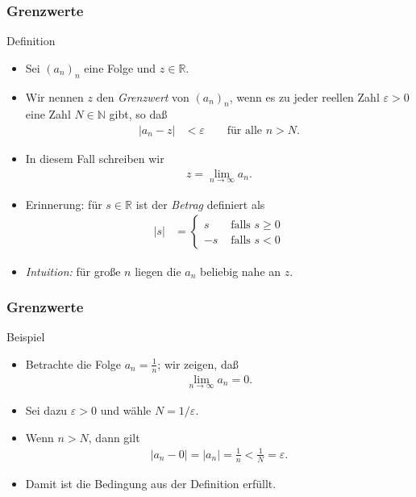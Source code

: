 \documentclass{beamer}
\renewcommand{\emph}[1]{{\textcolor{solarizedRed}{\itshape #1}}}
\newcommand\NN{\mathbb N}
\newcommand\RR{\mathbb R}
\newcommand{\eps}{\varepsilon}
\renewcommand{\ae}{\"a}
\newcommand{\ue}{\"u}
\newcommand{\mytitle}{Grenzwerte}
\begin{document}
\begin{frame}\frametitle{\mytitle}
	\begin{block}{Definition}
		\begin{itemize}
			\item Sei $(a_n)_n$ eine Folge und $z\in\RR$.
			\item Wir nennen $z$ den \emph{Grenzwert} von $(a_n)_n$, wenn es zu jeder reellen Zahl $\eps>0$ eine Zahl $N\in\NN$ gibt, so da\ss\ 
				\begin{align*}
					|a_n-z|&<\eps\qquad\mbox{f\ue r alle }n>N.
				\end{align*}
			\item In diesem Fall schreiben wir 
				\begin{align*}
					z=\lim_{n\to\infty}a_n.
				\end{align*}
			\item \alert{Erinnerung:} f\ue r $s\in\RR$ ist der \emph{Betrag} definiert als
				\begin{align*}
					|s|&=\begin{cases}
						s&\mbox{ falls }s\geq0\\
						-s&\mbox{ falls }s<0
					\end{cases}
				\end{align*}
			\item \emph{Intuition:} f\ue r gro\ss e $n$ liegen die $a_n$ beliebig nahe an $z$.
		\end{itemize}
	\end{block}
\end{frame}

\begin{frame}\frametitle{\mytitle}
	\begin{block}{Beispiel}
		\begin{itemize}
			\item Betrachte die Folge $a_n=\frac{1}{n}$; wir zeigen, da\ss\
				\begin{align*}
					\lim_{n\to\infty}a_n=0.
				\end{align*}
			\item Sei dazu $\eps>0$ und w\ae hle $N=1/\eps$.
			\item Wenn $n>N$, dann gilt
				\begin{align*}
				|a_n-0|=|a_n|=\frac{1}{n}<\frac{1}{N}=\eps.
				\end{align*}
			\item Damit ist die Bedingung aus der Definition erf\ue llt.
		\end{itemize}
	\end{block}
\end{frame}
\end{document}
